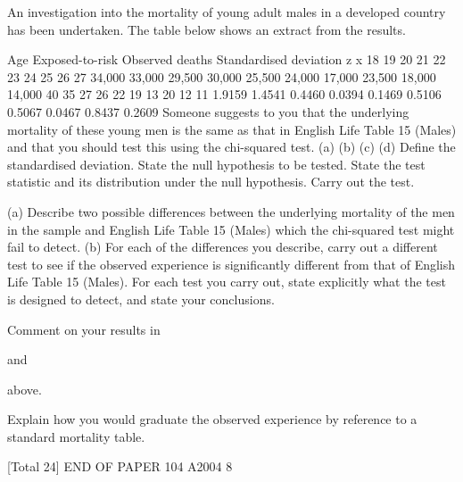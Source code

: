\documentclass[a4paper,12pt]{article}
\begin{document}
An investigation into the mortality of young adult males in a developed country has
been undertaken. The table below shows an extract from the results.
\item 
Age Exposed-to-risk Observed deaths Standardised deviation
z x
18
19
20
21
22
23
24
25
26
27 34,000
33,000
29,500
30,000
25,500
24,000
17,000
23,500
18,000
14,000 40
35
27
26
22
19
13
20
12
11 1.9159
1.4541
0.4460
0.0394
0.1469
0.5106
0.5067
0.0467
0.8437
0.2609
Someone suggests to you that the underlying mortality of these young men is
the same as that in English Life Table 15 (Males) and that you should test this
using the chi-squared test.
(a)
(b)
(c)
(d)
Define the standardised deviation.
State the null hypothesis to be tested.
State the test statistic and its distribution under the null hypothesis.
Carry out the test.

\item 
(a) Describe two possible differences between the underlying mortality of
the men in the sample and English Life Table 15 (Males) which the
chi-squared test might fail to detect.
(b) For each of the differences you describe, carry out a different test to
see if the observed experience is significantly different from that of
English Life Table 15 (Males). For each test you carry out, state
explicitly what the test is designed to detect, and state your
conclusions.

\item  Comment on your results in \item  and \item  above.
\item  Explain how you would graduate the observed experience by reference to a
standard mortality table.

[Total 24]
END OF PAPER
104 A2004
8
\end{document}
